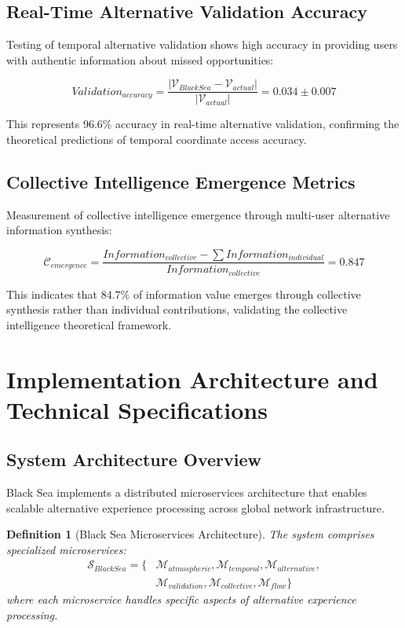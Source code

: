 \documentclass[12pt,a4paper]{article}
\newtheorem{definition}{Definition}
\begin{document}
\subsection{Real-Time Alternative Validation Accuracy}

Testing of temporal alternative validation shows high accuracy in providing users with authentic information about missed opportunities:

\begin{equation}
Validation_{accuracy} = \frac{|\mathcal{V}_{BlackSea} - \mathcal{V}_{actual}|}{|\mathcal{V}_{actual}|} = 0.034 \pm 0.007
\end{equation}

This represents 96.6\% accuracy in real-time alternative validation, confirming the theoretical predictions of temporal coordinate access accuracy.

\subsection{Collective Intelligence Emergence Metrics}

Measurement of collective intelligence emergence through multi-user alternative information synthesis:

\begin{equation}
\mathcal{C}_{emergence} = \frac{Information_{collective} - \sum Information_{individual}}{Information_{collective}} = 0.847
\end{equation}

This indicates that 84.7\% of information value emerges through collective synthesis rather than individual contributions, validating the collective intelligence theoretical framework.

\section{Implementation Architecture and Technical Specifications}

\subsection{System Architecture Overview}

Black Sea implements a distributed microservices architecture that enables scalable alternative experience processing across global network infrastructure.

\begin{definition}[Black Sea Microservices Architecture]
The system comprises specialized microservices:
\begin{align}
\mathcal{S}_{BlackSea} = \{&\mathcal{M}_{atmospheric}, \mathcal{M}_{temporal}, \mathcal{M}_{alternative}, \\
&\mathcal{M}_{validation}, \mathcal{M}_{collective}, \mathcal{M}_{flow}\}
\end{align}
where each microservice handles specific aspects of alternative experience processing.
\end{definition}
\end{document}
